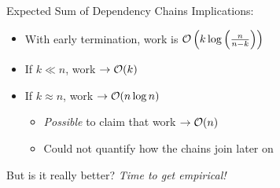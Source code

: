 \begin{frame}{Expected Sum of Dependency Chains}
  Implications:
  \begin{itemize}
    \item With early termination, work is \(\mathcal{O}\left(k \log\left(\frac{n}{n-k}\right)\right)\)
    \item If \(k \ll n\), work \(\to \mathcal{O}(k)\)
    \item If \(k \approx n\), work \(\to \mathcal{O}(n \log n)\)
      \begin{itemize}
        \item \textit{Possible} to claim that work \(\to \mathcal{O}(n)\)
        \item Could not quantify how the chains join later on
      \end{itemize}
  \end{itemize}
\end{frame}

\begin{frame}{But is it really better?}
  \centering
  \textit{Time to get empirical!}
\end{frame}
